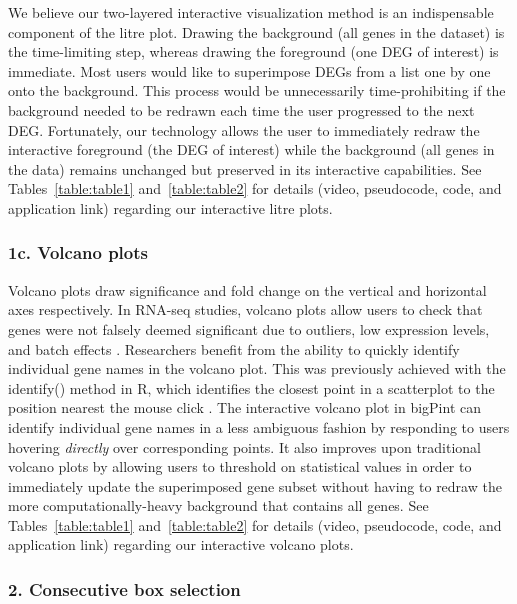 \documentclass[parskip=full]{bmcart} %
\begin{document}
We believe our two-layered interactive visualization method is an indispensable component of the litre plot. Drawing the background (all genes in the dataset) is the time-limiting step, whereas drawing the foreground (one DEG of interest) is immediate. Most users would like to superimpose DEGs from a list one by one onto the background. This process would be unnecessarily time-prohibiting if the background needed to be redrawn each time the user progressed to the next DEG. Fortunately, our technology allows the user to immediately redraw the interactive foreground (the DEG of interest) while the background (all genes in the data) remains unchanged but preserved in its interactive capabilities. See Tables~\ref{table:table1} and~\ref{table:table2} for details (video, pseudocode, code, and application link) regarding our interactive litre plots.

\subsubsection*{1c. Volcano plots}

Volcano plots draw significance and fold change on the vertical and horizontal axes respectively. In RNA-seq studies, volcano plots allow users to check that genes were not falsely deemed significant due to outliers, low expression levels, and batch effects \cite{li2011application}. Researchers benefit from the ability to quickly identify individual gene names in the volcano plot. This was previously achieved with the identify() method in R, which identifies the closest point in a scatterplot to the position nearest the mouse click \cite{li2011application}. The interactive volcano plot in bigPint can identify individual gene names in a less ambiguous fashion by responding to users hovering \textit{directly} over corresponding points. It also improves upon traditional volcano plots by allowing users to threshold on statistical values in order to immediately update the superimposed gene subset without having to redraw the more computationally-heavy background that contains all genes. See Tables~\ref{table:table1} and~\ref{table:table2} for details (video, pseudocode, code, and application link) regarding our interactive volcano plots.

\subsubsection*{2. Consecutive box selection}
\end{document}
